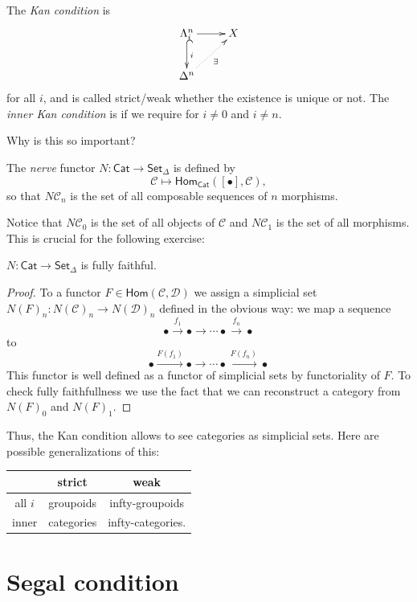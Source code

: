 The {\it Kan condition} is
$$
\xymatrix{
\Lambda^n_i\ar@{^{(}->}[d]^i \ar[r]&  X\\
\Delta^n\ar@{.>}[ur]_{\exists }
}
$$
for all $i$,
and is called strict/weak whether the
existence
is unique or not. The {\it inner Kan
condition}
is if we require for $i \neq 0$ and $i\neq
n$.

Why is this so important?

\begin{definition}
\label{definition-nerve}
The {\it nerve} functor $N:\mathsf{Cat} \to
\mathsf{Set}_\Delta$
is defined by
$$
\mathcal{C} \mapsto
\mathsf{Hom}_{\mathsf{Cat}}([\bullet],
\mathcal{C}),
$$
so that $N\mathcal{C}_n$ is the set
of all composable sequences of $n$ morphisms.
\end{definition}

Notice that $N\mathcal{C}_0$ is the set of
all objects of $\mathcal{C}$
and $N\mathcal{C}_1$ is the set of all
morphisms.
This is crucial for the following exercise:

\begin{exercise}
\label{exercise-}
$N:\mathsf{Cat}\to\mathsf{Set}_\Delta$ is
fully faithful.
\end{exercise}

\begin{proof}
To a functor $F \in
\mathsf{Hom}(\mathcal{C},\mathcal{D})$
we assign a simplicial set
$N(F)_n:N(\mathcal{C})_n \to
N(\mathcal{D})_n$
defined in the obvious way: we map a sequence
$$
\bullet \xrightarrow{f_1}\bullet\to \cdots
\bullet \xrightarrow{f_n}\bullet
$$
to
$$
\bullet \xrightarrow{F(f_1)}\bullet \to
\cdots
\bullet\xrightarrow{F(f_n)}\bullet
$$
This functor is well defined as a functor
of simplicial sets by functoriality of $F$.
To check fully faithfullness we use the fact
that we can reconstruct a category from
$N(F)_0$ and $N(F)_1$.
\end{proof}

Thus, the Kan condition allows to see
categories
as simplicial sets. Here are possible
generalizations
of this:

\begin{center}
\begin{tabular}{c | c | c}
& strict &weak\\
\hline
all $i$ & groupoids & infty-groupoids\\
inner & categories & infty-categories.
\end{tabular}
\end{center}

\section{Segal condition}
\label{section-segal-condition}

